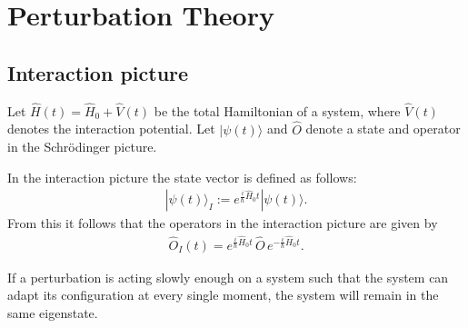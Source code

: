 \chapter{Perturbation Theory}

\section{Interaction picture}\label{section:interaction_picture}

    Let $\hat{H}(t)=\hat{H}_0+\hat{V}(t)$ be the total Hamiltonian of a system, where $\hat{V}(t)$ denotes the interaction potential. Let $|\psi(t)\rangle$ and $\hat{O}$ denote a state and operator in the Schr\"odinger picture.
    \begin{definition}
        In the interaction picture the state vector is defined as follows:
        \begin{gather}
            |\psi(t)\rangle_I := e^{\frac{i}{\hbar}\hat{H}_0t}|\psi(t)\rangle.
        \end{gather}
        From this it follows that the operators in the interaction picture are given by
        \begin{gather}
            \hat{O}_I(t) = e^{\tfrac{i}{\hbar}\hat{H}_0t}\,\hat{O}\,e^{-\tfrac{i}{\hbar}\hat{H}_0t}.
        \end{gather}
    \end{definition}

    \begin{theorem}
        If a perturbation is acting slowly enough on a system such that the system can adapt its configuration at every single moment, the system will remain in the same eigenstate.
    \end{theorem}

